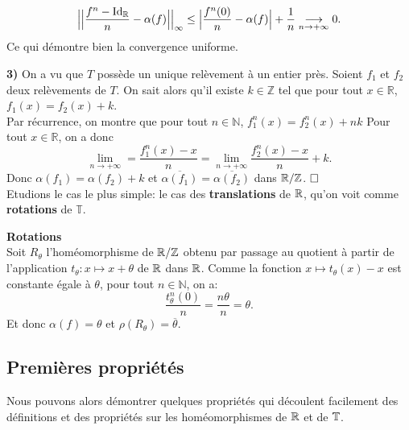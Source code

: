 		$$\Big|\Big|\frac{f^n - \mathrm{Id}_{{\mathbb{R}}}}{n} - \alpha(f)\Big|\Big|_{\infty} \leq \Big|\frac{f^n(0)}{n}-\alpha(f)\Big| + \frac{1}{n} \underset{n \to + \infty}{\longrightarrow}0.$$
	Ce qui démontre bien la convergence uniforme.
	\\
	\par\textbf{3)} On a vu que $T$ possède un unique relèvement à un entier près. Soient $f_1$ et $f_2$ deux relèvements de $T$. On sait alors qu'il existe $k \in \mathbb{Z}$ tel que pour tout $x \in \mathbb{R}$, $f_1(x)=f_2(x)+k$.\\
	Par récurrence, on montre que pour tout $n \in \mathbb{N}$, $f_1^n(x)=f_2^n(x)+nk$
	Pour tout $x \in \mathbb{R}$, on a donc
	$$\underset{n \longrightarrow + \infty}{\lim} = \frac{f_1^n(x)-x}{n} =\underset{n \longrightarrow + \infty}{\lim} \frac{f_2^n(x)-x}{n} + k .$$
	Donc $\alpha(f_1)=\alpha(f_2)+k$ et $\overline{\alpha(f_1)}=\overline{\alpha(f_2)}$ dans ${\mathbb{R}}/\mathbb{Z}$.	$ \hfill \square$\\











Etudions le cas le plus simple: le cas des \textbf{translations} de ${\mathbb{R}}$, qu'on voit comme \textbf{rotations} de $\mathbb{T}$.

\begin{example}\label{rotation}
	\textbf{Rotations}\\
	Soit $R_{\theta}$ l'homéomorphisme de ${\mathbb{R}}/\mathbb{Z}$ obtenu par passage au quotient à partir de l'application $t_\theta: x \mapsto x +\theta$ de ${\mathbb{R}}$ dans ${\mathbb{R}}$. Comme la fonction $x\mapsto t_\theta(x)-x$ est constante égale à $\theta$, pour tout $n \in \mathbb{N}$, on a:
	$$\frac{t_\theta^n(0)}{n}= \frac{n \theta}{n} = \theta.$$
	Et donc $\alpha(f)=\theta$ et $\rho(R_\theta)=\overline{\theta}.$
\end{example}






















\subsection{Premières propriétés}
Nous pouvons alors démontrer quelques propriétés qui découlent facilement des définitions et des propriétés sur les homéomorphismes de ${\mathbb{R}}$ et de ${\mathbb{T}}$.

